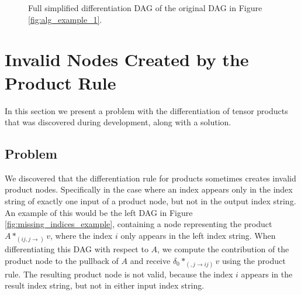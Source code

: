 \documentclass[12pt, a4paper]{report}
\begin{document}
\begin{figure}
    \centering
    \caption{Full simplified differentiation DAG of the original DAG in Figure \ref{fig:alg_example_1}.}
    \label{fig:alg_example_3}
\end{figure}

\FloatBarrier
\section{Invalid Nodes Created by the Product Rule}
In this section we present a problem with the differentiation of tensor products that was discovered during development, along with a solution.

\subsection{Problem}
We discovered that the differentiation rule for products sometimes creates invalid product nodes.
Specifically in the case where an index appears only in the index string of exactly one input of a product node, but not in the output index string.
An example of this would be the left DAG in Figure \ref{fig:missing_indices_example}, containing a node representing the product $A *_{(ij,j \rightarrow )} v$, where the index $i$ only appears in the left index string.
When differentiating this DAG with respect to $A$, we compute the contribution of the product node to the pullback of $A$ and receive $\delta_0 *_{(,j \rightarrow ij)} v$ using the product rule.
The resulting product node is not valid, because the index $i$ appears in the result index string, but not in either input index string.
\end{document}
